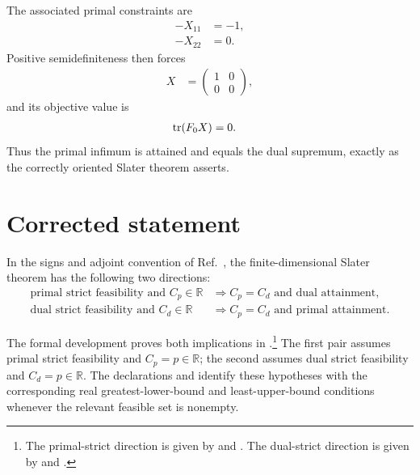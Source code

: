 \documentclass{article}
\begin{document}
The associated primal constraints are
\begin{align}
  -X_{11}
    &=-1,
  \label{eq:wolf_slater_attainment_conditions_primal_first_diagonal}\\
  -X_{22}
    &=0.
  \label{eq:wolf_slater_attainment_conditions_primal_second_diagonal}
\end{align}
Positive semidefiniteness then forces
\begin{align}
  X
    &=\begin{pmatrix}1&0\\0&0\end{pmatrix},
  \label{eq:wolf_slater_attainment_conditions_primal_optimizer}
\end{align}
and its objective value is
\begin{align}
  \operatorname{tr}(F_0X)
    &=0.
  \label{eq:wolf_slater_attainment_conditions_primal_optimum}
\end{align}
Thus the primal infimum is attained and equals the dual supremum, exactly as
the correctly oriented Slater theorem asserts.

\section{Corrected statement}

In the signs and adjoint convention of Ref.~\cite{Wolf2012Quantum}, the
finite-dimensional Slater theorem has the following two directions:
\begin{align}
  \text{primal strict feasibility and }C_p\in\mathbb R
    &\Longrightarrow
      C_p=C_d\text{ and dual attainment},
  \label{eq:wolf_slater_attainment_conditions_corrected_primal_direction}\\
  \text{dual strict feasibility and }C_d\in\mathbb R
    &\Longrightarrow
      C_p=C_d\text{ and primal attainment}.
  \label{eq:wolf_slater_attainment_conditions_corrected_dual_direction}
\end{align}

The formal development proves both implications in
.\footnote{The primal-strict direction
is given by
and
.
The dual-strict direction is given by
and
.}
The first pair assumes primal strict feasibility and $C_p=p\in\mathbb R$; the
second assumes dual strict feasibility and $C_d=p\in\mathbb R$. The
declarations
 and
 identify these hypotheses
with the corresponding real greatest-lower-bound and least-upper-bound
conditions whenever the relevant feasible set is nonempty.
\end{document}
